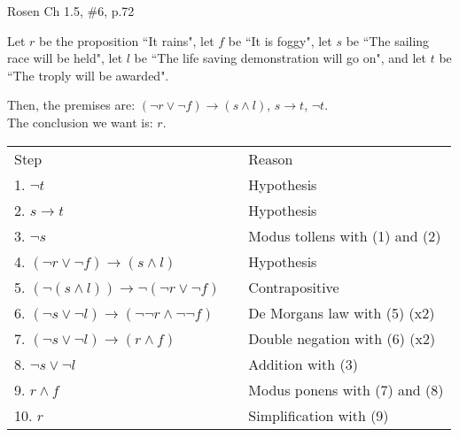 \documentclass[12pt]{exam}
\newenvironment{my_parts}{
\begin{parts}
    \setlength{\itemsep}{1pt}
    \setlength{\parskip}{0pt}
    \setlength{\parsep}{0pt}
}{\end{parts}}
\begin{document}
\begin{questions}
\begin{solution}
    \end{solution}


\question[8] Rosen Ch 1.5, \#6, p.72
    \begin{solution}
    Let $r$ be the proposition ``It rains", let $f$ be ``It is foggy",
    let $s$ be ``The sailing race will be held", let $l$ be ``The life
    saving demonstration will go on", and let $t$ be ``The troply will
    be awarded".

    Then, the premises are: $(\neg r \vee \neg f) \rightarrow (s \wedge l)$, $s \rightarrow t$, $\neg t$. \\
    The conclusion we want is: $r$.

    \begin{tabular}{lll}
        Step    & \hspace{0.2in} & Reason \\
        1. $\neg t$                 &       & Hypothesis \\
        2. $s \rightarrow t$        &       & Hypothesis \\
        3. $\neg s$                 &       & Modus tollens with (1) and (2) \\
        4. $(\neg r \vee \neg f) \rightarrow (s \wedge l)$  &   & Hypothesis \\
        5. $(\neg(s \wedge l)) \rightarrow \neg(\neg r \vee \neg f)$    & & Contrapositive \\
        6. $(\neg s \vee \neg l) \rightarrow (\neg \neg r \wedge \neg \neg f)$ & & De Morgans law with (5) (x2) \\
        7. $(\neg s \vee \neg l) \rightarrow (r \wedge f)$  & & Double negation with (6) (x2) \\
        8. $\neg s \vee \neg l$     &       & Addition with (3) \\
        9. $r \wedge f$             &       & Modus ponens with (7) and (8) \\
        10. $r$                     &       & Simplification with (9)
    \end{tabular}
    \end{solution}



\end{questions}
\end{document}
